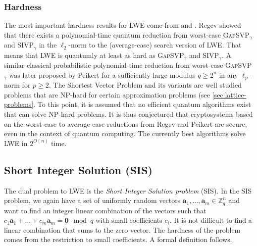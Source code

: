 \subsubsection{Hardness} \label{sec:lwe-hardness}
The most important hardness results for LWE come from \cite{Reg05} and \cite{Pei09}. Regev showed that there exists a polynomial-time quantum reduction from worst-case \textsc{GapSVP}$_\gamma$ and SIVP$_\gamma$ in the $\ell_2$-norm to the (average-case) search version of LWE. That means that LWE is quantumly at least as hard as \textsc{GapSVP}$_\gamma$ and SIVP$_\gamma$. A similar classical probabilistic polynomial-time reduction from worst-case \textsc{GapSVP}$_\gamma$ was later proposed by Peikert for a sufficiently large modulus $q\geq 2^n$ in any $\ell_p$-norm for $p \geq 2$. The Shortest Vector Problem and its variants are well studied problems that are NP-hard for certain approximation problems (see \cref{sec:lattice-problems}. To this point, it is assumed that no efficient quantum algorithms exist that can solve NP-hard problems. It is thus conjectured that cryptosystems based on the worst-case to average-case reductions from Regev and Peikert are secure, even in the context of quantum computing. The currently best algorithms solve LWE in $2^{O(n)}$ time.




\subsection{Short Integer Solution (SIS)}
The dual problem to LWE is the \textit{Short Integer Solution problem} (SIS).
In the SIS problem, we again have a set of uniformly random vectors $\mathbf{a}_1, \ldots, \mathbf{a}_m \in \mathbb{Z}_q^n$ and want to find an integer linear combination of the vectors such that $c_1 \mathbf{a}_1 + \dots  + c_m \mathbf{a}_m = \mathbf{0} \mod q$ with small coefficients $c_i$. It is not difficult to find a linear combination that sums to the zero vector. The hardness of the problem comes from the restriction to small coefficients. A formal definition follows. %


